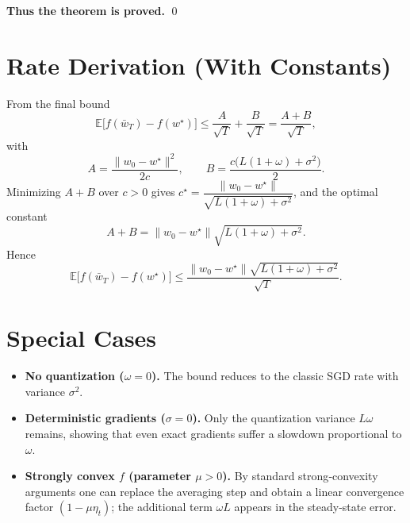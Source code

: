 \documentclass{article}
\newcommand{\EE}{\mathbb{E}}
\begin{document}
\noindent\textbf{Thus the theorem is proved.} \qed

\section*{Rate Derivation (With Constants)}
From the final bound
\[
\EE\!\big[f(\bar w_T)-f(w^\star)\big]\le
\frac{A}{\sqrt{T}}+\frac{B}{\sqrt{T}}
= \frac{A+B}{\sqrt{T}},
\]
with 
\[
A=\frac{\|w_0-w^\star\|^2}{2c},\qquad
B=\frac{c\big(L(1+\omega)+\sigma^2\big)}{2}.
\]
Minimizing $A+B$ over $c>0$ gives $c^\star =\dfrac{\|w_0-w^\star\|}{\sqrt{L(1+\omega)+\sigma^2}}$, and the optimal constant
\[
A+B = \|w_0-w^\star\|\sqrt{L(1+\omega)+\sigma^2}.
\]
Hence
\[
\boxed{\EE\!\big[f(\bar w_T)-f(w^\star)\big]\le
\frac{\|w_0-w^\star\|\sqrt{L(1+\omega)+\sigma^2}}{\sqrt{T}} } .
\]

\section*{Special Cases}
\begin{itemize}
\item \textbf{No quantization ($\omega=0$).} The bound reduces to the classic SGD rate with variance $\sigma^2$.
\item \textbf{Deterministic gradients ($\sigma=0$).} Only the quantization variance $L\omega$ remains, showing that even exact gradients suffer a slowdown proportional to $\omega$.
\item \textbf{Strongly convex $f$ (parameter $\mu>0$).} By standard strong‑convexity arguments one can replace the averaging step and obtain a linear convergence factor $(1-\mu\eta_t)$; the additional term $\omega L$ appears in the steady‑state error.
\end{itemize}
\end{document}
